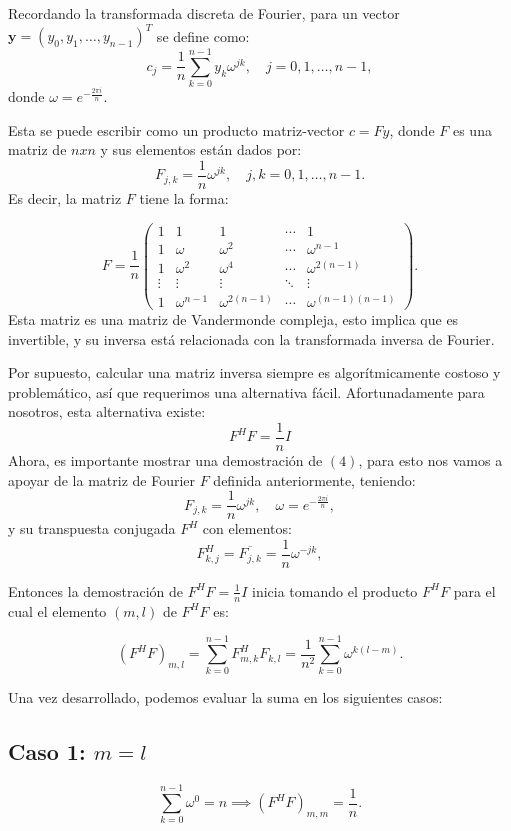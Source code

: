 \documentclass{article}
\begin{document}
\noindent Recordando la transformada discreta de Fourier, para un vector \(\mathbf{y} = (y_0, y_1, \ldots, y_{n-1})^T\) se define como:
\[
c_j = \frac{1}{n} \sum_{k=0}^{n-1} y_k \omega^{jk}, \quad j = 0, 1, \ldots, n-1,
\]
donde \(\omega = e^{-\frac{2\pi i}{n}}\).

Esta se puede escribir como un producto matriz-vector \(c = Fy\), donde \(F\) es una matriz de \(nxn\) y sus elementos están dados por: 
\[
F_{j,k} = \frac{1}{n} \omega^{jk}, \quad j, k = 0, 1, \ldots, n-1.
\]
Es decir, la matriz \(F\) tiene la forma:

\[
F = \frac{1}{n}
\begin{pmatrix}
1 & 1 & 1 & \cdots & 1 \\
1 & \omega & \omega^2 & \cdots & \omega^{n-1} \\
1 & \omega^2 & \omega^4 & \cdots & \omega^{2(n-1)} \\
\vdots & \vdots & \vdots & \ddots & \vdots \\
1 & \omega^{n-1} & \omega^{2(n-1)} & \cdots & \omega^{(n-1)(n-1)}
\end{pmatrix}.
\]
Esta matriz es una matriz de Vandermonde compleja, esto implica que es invertible, y su inversa está relacionada con la transformada inversa de Fourier.

Por supuesto, calcular una matriz inversa siempre es algorítmicamente costoso y problemático, así que requerimos una alternativa fácil. Afortunadamente para nosotros, esta alternativa existe:
\begin{equation}
    F^H F = \frac{1}{n}I
\end{equation}
Ahora, es importante mostrar una demostración de $(4)$, para esto nos vamos a apoyar de la matriz de Fourier \(F\) definida anteriormente, teniendo:
\[
F_{j,k} = \frac{1}{n} \omega^{jk}, \quad \omega = e^{-\frac{2\pi i}{n}},
\]
y su transpuesta conjugada \(F^H\) con elementos:
\[
F^H_{k,j} = \overline{F_{j,k}} = \frac{1}{n} \omega^{-jk},
\]


Entonces la demostración de \(F^H F = \frac{1}{n}I\) inicia tomando el producto \(F^H F\) para el cual el elemento \((m, l)\) de \(F^H F\) es:

\[
(F^H F)_{m,l} = \sum_{k=0}^{n-1} F^H_{m,k} F_{k,l} = \frac{1}{n^2} \sum_{k=0}^{n-1} \omega^{k(l-m)}.
\]

Una vez desarrollado, podemos evaluar la suma en los siguientes casos:

\subsection*{Caso 1: \(m = l\)}
\[
\sum_{k=0}^{n-1} \omega^{0} = n \implies (F^H F)_{m,m} = \frac{1}{n}.
\]
\end{document}
